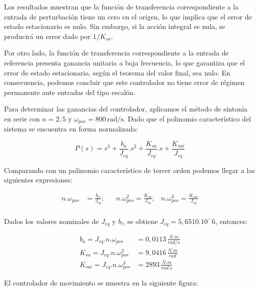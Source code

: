 \documentclass{article}
\begin{document}
Los resultados muestran que la función de transferencia correspondiente a la entrada de perturbación 
tiene un cero en el origen, lo que implica que el error de estado estacionario es nulo. Sin embargo, 
si la acción integral es nula, se producirá un error dado por $1/K_{sa}$.

Por otro lado, la función de transferencia correspondiente a la entrada de referencia presenta ganancia 
unitaria a baja frecuencia, lo que garantiza que el error de estado estacionario, según el teorema del 
valor final, sea nulo. En consecuencia, podemos concluir que este controlador no tiene error de régimen 
permanente ante entradas del tipo escalón.

Para determinar las ganancias del controlador, aplicamos el método de sintonía en serie con $n = 2,5$ y 
$\omega_{pos} = 800 \, \text{rad/s}$. Dado que el polinomio característico del sistema se encuentra en 
forma normalizada:

\begin{equation}
    P(s) = s^3 + \frac{b_a}{J_{eq}}.s^2 + \frac{K_{sa}}{J_{eq}}.s + \frac{K_{sai}}{J_{eq}}
\end{equation}

Comparando con un polinomio característico de tercer orden
podemos llegar a las siguientes expresiones:

\begin{align*}
    n.\omega_{pos} &= \frac{b_a}{J_{eq}}; & &n.\omega_{pos}^2 = \frac{K_{sa}}{J_{eq}}; & n.\omega_{pos}^3 = \frac{K_{sai}}{J_{eq}} \\
\end{align*}

Dados los valores nominales de $J_{eq}$ y $b_l$, se obtiene $J_{eq} = 5,6510.10^-6$, entonces:

\begin{align*}
    b_a = J_{eq}.n.\omega_{pos} &= 0,0113\, \frac{N.m}{rad/s} \\ 
    K_{sa} = J_{eq}.n.\omega_{pos}^2 &= 9,0416\, \frac{N.m}{rad} \\
    K_{sai} = J_{eq}.n.\omega_{pos}^3 &= 2893\, \frac{N.m}{rad.s}
\end{align*}

El controlador de movimiento se muestra en la siguiente figura: 

\end{document}
